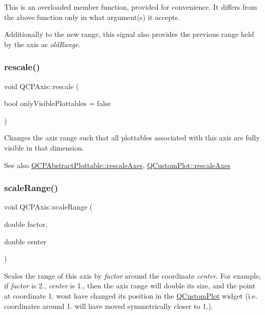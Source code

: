 This is an overloaded member function, provided for convenience. It differs from the above function only in what argument(s) it accepts.

Additionally to the new range, this signal also provides the previous range held by the axis as {\itshape old\+Range}. \mbox{\label{class_q_c_p_axis_a499345f02ebce4b23d8ccec96e58daa9}} 
\subsubsection{\texorpdfstring{rescale()}{rescale()}}
{\footnotesize\ttfamily void Q\+C\+P\+Axis\+::rescale (\begin{DoxyParamCaption}\item[{bool}]{only\+Visible\+Plottables = {\ttfamily false} }\end{DoxyParamCaption})}

Changes the axis range such that all plottables associated with this axis are fully visible in that dimension.

\begin{DoxySeeAlso}{See also}
\mbox{\hyperlink{class_q_c_p_abstract_plottable_a1491c4a606bccd2d09e65e11b79eb882}{Q\+C\+P\+Abstract\+Plottable\+::rescale\+Axes}}, \mbox{\hyperlink{class_q_custom_plot_ad86528f2cee6c7e446dea4a6e8839935}{Q\+Custom\+Plot\+::rescale\+Axes}} 
\end{DoxySeeAlso}
\mbox{\label{class_q_c_p_axis_a7072ff96fe690148f1bbcdb4f773ea1c}} 
\subsubsection{\texorpdfstring{scale\+Range()}{scaleRange()}}
{\footnotesize\ttfamily void Q\+C\+P\+Axis\+::scale\+Range (\begin{DoxyParamCaption}\item[{double}]{factor,  }\item[{double}]{center }\end{DoxyParamCaption})}

Scales the range of this axis by {\itshape factor} around the coordinate {\itshape center}. For example, if {\itshape factor} is 2., {\itshape center} is 1., then the axis range will double its size, and the point at coordinate 1. won\textquotesingle{}t have changed its position in the \mbox{\hyperlink{class_q_custom_plot}{Q\+Custom\+Plot}} widget (i.\+e. coordinates around 1. will have moved symmetrically closer to 1.). \mbox{\label{class_q_c_p_axis_a3505ed8a93bd2e349d858d84996bf767}} 
